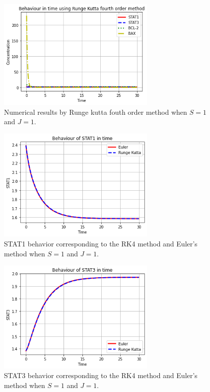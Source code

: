 \begin{figure}[hbt!]
	\centering
	\begin{framed}
	\includegraphics[width=0.68\textwidth]{Figures/D/N2.png}
		\end{framed}
	\caption{Numerical results  by Runge kutta fouth order method when $S =1$ and $J=1$. }
	\label{r20}
\end{figure}

\begin{figure}[hbt!]
	\centering
	\begin{framed}
	\includegraphics[width=0.68\textwidth]{Figures/D/N3.png}
		\end{framed}
	\caption{STAT1 behavior corresponding to the RK4 method and Euler's method when $S =1$ and $J=1$.}
	\label{r21}
\end{figure}

\begin{figure}[hbt!]
	\centering
	\begin{framed}
	\includegraphics[width=0.68\textwidth]{Figures/D/N4.png}
		\end{framed}
	\caption{STAT3 behavior corresponding to the RK4 method and Euler's method when $S =1$ and $J=1$.}
	\label{r22}
\end{figure}

